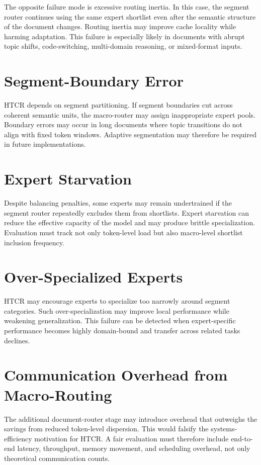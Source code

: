 The opposite failure mode is excessive routing inertia. In this case, the segment router continues using the same expert shortlist even after the semantic structure of the document changes. Routing inertia may improve cache locality while harming adaptation. This failure is especially likely in documents with abrupt topic shifts, code-switching, multi-domain reasoning, or mixed-format inputs.

\section{Segment-Boundary Error}

HTCR depends on segment partitioning. If segment boundaries cut across coherent semantic units, the macro-router may assign inappropriate expert pools. Boundary errors may occur in long documents where topic transitions do not align with fixed token windows. Adaptive segmentation may therefore be required in future implementations.

\section{Expert Starvation}

Despite balancing penalties, some experts may remain undertrained if the segment router repeatedly excludes them from shortlists. Expert starvation can reduce the effective capacity of the model and may produce brittle specialization. Evaluation must track not only token-level load but also macro-level shortlist inclusion frequency.

\section{Over-Specialized Experts}

HTCR may encourage experts to specialize too narrowly around segment categories. Such over-specialization may improve local performance while weakening generalization. This failure can be detected when expert-specific performance becomes highly domain-bound and transfer across related tasks declines.

\section{Communication Overhead from Macro-Routing}

The additional document-router stage may introduce overhead that outweighs the savings from reduced token-level dispersion. This would falsify the systems-efficiency motivation for HTCR. A fair evaluation must therefore include end-to-end latency, throughput, memory movement, and scheduling overhead, not only theoretical communication counts.

